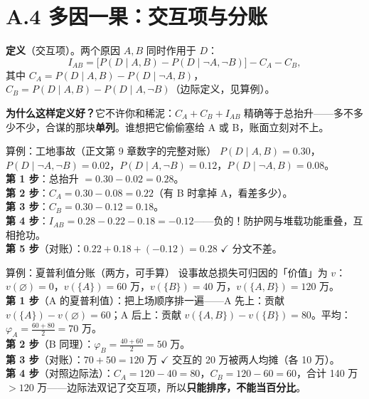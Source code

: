 \documentclass[../../main2.tex]{subfiles}
\begin{document}
\section{A.4 多因一果：交互项与分账}
\label{app:interaction}


\begin{definitionbox}
	\textbf{定义}（交互项）。两个原因 $A, B$ 同时作用于 $D$：
	\[
	I_{AB} = \big[P(D \mid A,B) - P(D \mid \neg A, \neg B)\big] - C_A - C_B,
	\]
	其中 $C_A = P(D \mid A,B) - P(D \mid \neg A, B)$，$C_B = P(D \mid A,B) - P(D \mid A, \neg B)$（边际定义，见算例）。
\end{definitionbox}

\textbf{为什么这样定义好？}它不许你和稀泥：$C_A + C_B + I_{AB}$ 精确等于总抬升——多不多少不少，合谋的那块\textbf{单列}。谁想把它偷偷塞给 A 或 B，账面立刻对不上。

\begin{mathbox}{算例：工地事故（正文第 9 章数字的完整对账）}
	$P(D \mid A,B) = 0.30$，$P(D \mid \neg A, \neg B) = 0.02$，$P(D \mid A,\neg B) = 0.12$，$P(D \mid \neg A, B) = 0.08$。\\
	\textbf{第 1 步}：总抬升 $= 0.30 - 0.02 = 0.28$。\\
	\textbf{第 2 步}：$C_A = 0.30 - 0.08 = 0.22$（有 B 时拿掉 A，看差多少）。\\
	\textbf{第 3 步}：$C_B = 0.30 - 0.12 = 0.18$。\\
	\textbf{第 4 步}：$I_{AB} = 0.28 - 0.22 - 0.18 = -0.12$——负的！防护网与堆载功能重叠，互相抢功。\\
	\textbf{第 5 步}（对账）：$0.22 + 0.18 + (-0.12) = 0.28$ $\checkmark$ 分文不差。
\end{mathbox}

\begin{mathbox}{算例：夏普利值分账（两方，可手算）}
	设事故总损失可归因的「价值」为 $v$：$v(\varnothing)=0$，$v(\{A\})=60$ 万，$v(\{B\})=40$ 万，$v(\{A,B\})=120$ 万。\\
	\textbf{第 1 步}（A 的夏普利值）：把上场顺序排一遍——A 先上：贡献 $v(\{A\})-v(\varnothing)=60$；A 后上：贡献 $v(\{A,B\})-v(\{B\})=80$。平均：$\varphi_A = \tfrac{60+80}{2} = 70$ 万。\\
	\textbf{第 2 步}（B 同理）：$\varphi_B = \tfrac{40+60}{2} = 50$ 万。\\
	\textbf{第 3 步}（对账）：$70 + 50 = 120$ 万 $\checkmark$ 交互的 20 万被两人均摊（各 10 万）。\\
	\textbf{第 4 步}（对照边际法）：$C_A = 120-40 = 80$，$C_B = 120-60 = 60$，合计 140 万 $> 120$ 万——边际法双记了交互项，所以\textbf{只能排序，不能当百分比}。
\end{mathbox}
\end{document}
